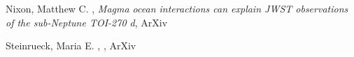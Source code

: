 \item[{\color{numcolor}\scriptsize2}] Nixon, Matthew C. , \emph{Magma ocean interactions can explain JWST observations of the sub-Neptune TOI-270 d}, ArXiv

\item[{\color{numcolor}\scriptsize1}] Steinrueck, Maria E. , , ArXiv